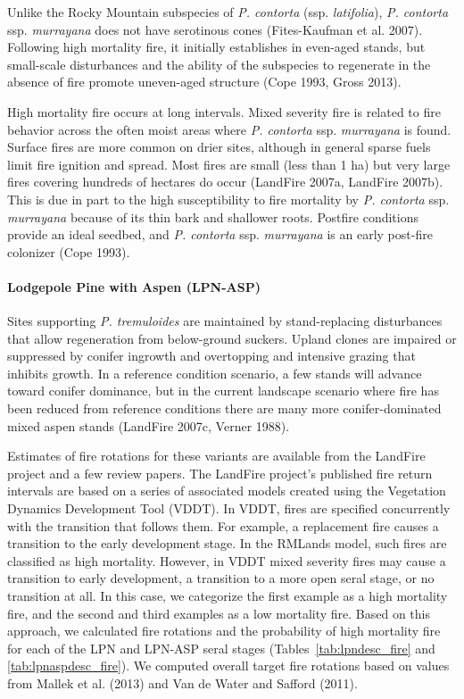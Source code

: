 Unlike the Rocky Mountain subspecies of \emph{P. contorta} (ssp. \emph{latifolia}), \emph{P. contorta} ssp. \emph{murrayana} does not have serotinous cones (Fites-Kaufman et al. 2007). Following high mortality fire, it initially establishes in even-aged stands, but small-scale disturbances and the ability of the subspecies to regenerate in the absence of fire promote uneven-aged structure (Cope 1993, Gross 2013).

High mortality fire occurs at long intervals. Mixed severity fire is related to fire behavior across the often moist areas where \emph{P. contorta} ssp. \emph{murrayana} is found. Surface fires are more common on drier sites, although in general sparse fuels limit fire ignition and spread. Most fires are small (less than 1 ha) but very large fires covering hundreds of hectares do occur (LandFire 2007a, LandFire 2007b). This is due in part to the high susceptibility to fire mortality by \emph{P. contorta} ssp. \emph{murrayana} because of its thin bark and shallower roots. Postfire conditions provide an ideal seedbed, and \emph{P. contorta} ssp. \emph{murrayana} is an early post-fire colonizer (Cope 1993).

\paragraph{Lodgepole Pine with Aspen (LPN-ASP)}			Sites supporting \emph{P. tremuloides} are maintained by stand-replacing disturbances that allow regeneration from below-ground suckers. Upland clones are impaired or suppressed by conifer ingrowth and overtopping and intensive grazing that inhibits growth. In a reference condition scenario, a few stands will advance toward conifer dominance, but in the current landscape scenario where fire has been reduced from reference conditions there are many more conifer-dominated mixed aspen stands (LandFire 2007c, Verner 1988). 

Estimates of fire rotations for these variants are available from the LandFire project and a few review papers. The LandFire project’s published fire return intervals are based on a series of associated models created using the Vegetation Dynamics Development Tool (VDDT). In VDDT, fires are specified concurrently with the transition that follows them. For example, a replacement fire causes a transition to the early development stage. In the RMLands model, such fires are classified as high mortality. However, in VDDT mixed severity fires may cause a transition to early development, a transition to a more open seral stage, or no transition at all. In this case, we categorize the first example as a high mortality fire, and the second and third examples as a low mortality fire. Based on this approach, we calculated fire rotations and the probability of high mortality fire for each of the LPN and LPN-ASP seral stages (Tables~\ref{tab:lpndesc_fire} and \ref{tab:lpnaspdesc_fire}). We computed overall target fire rotations based on values from Mallek et al. (2013) and Van de Water and Safford (2011). 



